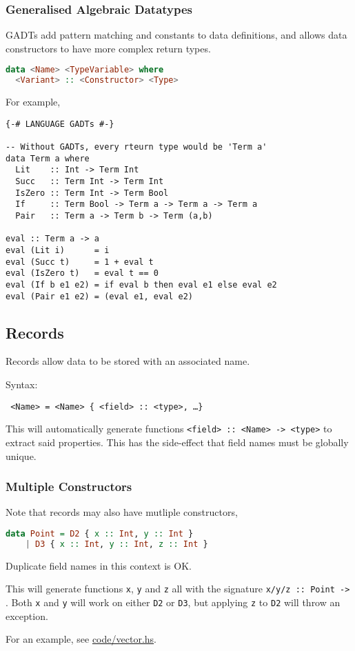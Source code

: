 \subsubsection{Generalised Algebraic Datatypes}
GADTs add pattern matching and constants to data definitions, and allows data constructors to have more complex return types.

\begin{lstlisting}[language=haskell]
data <Name> <TypeVariable> where
  <Variant> :: <Constructor> <Type>
\end{lstlisting}

For example,
\begin{lstlisting}
{-# LANGUAGE GADTs #-}

-- Without GADTs, every rteurn type would be 'Term a'
data Term a where
  Lit    :: Int -> Term Int
  Succ   :: Term Int -> Term Int
  IsZero :: Term Int -> Term Bool
  If     :: Term Bool -> Term a -> Term a -> Term a
  Pair   :: Term a -> Term b -> Term (a,b)

eval :: Term a -> a
eval (Lit i)      = i
eval (Succ t)     = 1 + eval t
eval (IsZero t)   = eval t == 0
eval (If b e1 e2) = if eval b then eval e1 else eval e2
eval (Pair e1 e2) = (eval e1, eval e2)
\end{lstlisting}

\subsection{Records}
Records allow data to be stored with an associated name.

Syntax:
\begin{center}
  \texttt{ <Name> = <Name> \{ <field> :: <type>, \ldots \}}
\end{center}
This will automatically generate functions \texttt{<field> :: <Name> -> <type>} to extract said properties. This has the side-effect that field names must be globally unique.

\subsubsection{Multiple Constructors}
Note that records may also have mutliple constructors,
\begin{lstlisting}[language=haskell]
  data Point = D2 { x :: Int, y :: Int }
    | D3 { x :: Int, y :: Int, z :: Int }
\end{lstlisting}

Duplicate field names in this context is OK.

This will generate functions \texttt{x}, \texttt{y} and \texttt{z} all with the signature \texttt{x/y/z :: Point -> }. Both \texttt{x} and \texttt{y} will work on either \texttt{D2} or \texttt{D3}, but applying \texttt{z} to \texttt{D2} will throw an exception.

For an example, see \url{code/vector.hs}.